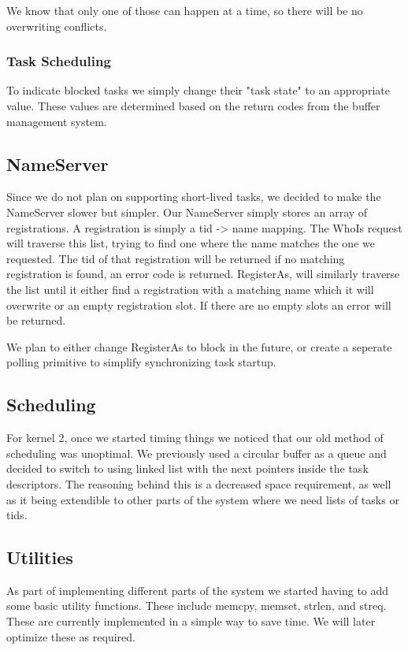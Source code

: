 \documentclass{article}
\begin{document}
We know that only one of those can happen at a time, so there will be no overwriting conflicts.

\subsubsection{Task Scheduling}

To indicate blocked tasks we simply change their "task state" to an appropriate value. These values are determined based on the return codes from the buffer management system.

\subsection{NameServer}

Since we do not plan on supporting short-lived tasks, we decided to make the NameServer slower but simpler. Our NameServer simply stores an array of registrations. A registration is simply a tid -> name mapping. The WhoIs request will traverse this list, trying to find one where the name matches the one we requested. The tid of that registration will be returned if no matching registration is found, an error code is returned. RegisterAs, will similarly traverse the list until it either find a registration with a matching name which it will overwrite or an empty registration slot. If there are no empty slots an error will be returned.

We plan to either change RegisterAs to block in the future, or create a seperate polling primitive to simplify synchronizing task startup.

\subsection{Scheduling}

For kernel 2, once we started timing things we noticed that our old method of scheduling was unoptimal. We previously used a circular buffer as a queue and decided to switch to using linked list with the next pointers inside the task descriptors. The reasoning behind this is a decreased space requirement, as well as it being extendible to other parts of the system where we need lists of tasks or tids.

\subsection{Utilities}

As part of implementing different parts of the system we started having to add some basic utility functions. These include memcpy, memset, strlen, and streq. These are currently implemented in a simple way to save time. We will later optimize these as required.
\end{document}
